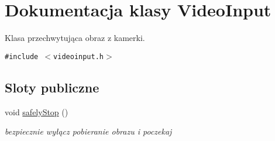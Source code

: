 \hypertarget{class_video_input}{
\section{Dokumentacja klasy VideoInput}
\label{class_video_input}
}
Klasa przechwytująca obraz z kamerki.  


{\tt \#include $<$videoinput.h$>$}

\subsection*{Sloty publiczne}
\begin{CompactItemize}
\item 
\hypertarget{class_video_input_78e2d773100160be101d3c48ecdfb910}{
void \hyperlink{class_video_input_78e2d773100160be101d3c48ecdfb910}{safelyStop} ()}
\label{class_video_input_78e2d773100160be101d3c48ecdfb910}

\begin{CompactList}\small\item\em bezpiecznie wyłącz pobieranie obrazu i poczekaj \item\end{CompactList}\end{CompactItemize}
